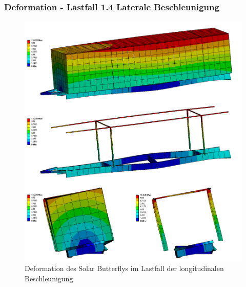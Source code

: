 \subsubsection{Deformation - Lastfall 1.4 Laterale Beschleunigung}
\begin{figure}[H]
  \centering
  \includegraphics[width=1\linewidth]{04_figures/FEM 1.4.png}
  \caption{Deformation des Solar Butterflys im Lastfall der longitudinalen Beschleunigung}
  \label{FEM 1.4}
\end{figure}

